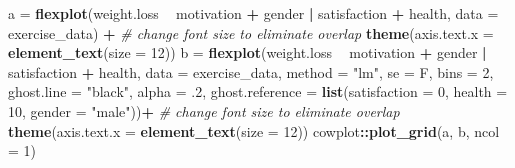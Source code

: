 \documentclass[
  doc]{apa6}
\newenvironment{Shaded}{\begin{snugshade}}{\end{snugshade}}
\newcommand{\CommentTok}[1]{\textcolor[rgb]{0.56,0.35,0.01}{\textit{#1}}}
\newcommand{\DataTypeTok}[1]{\textcolor[rgb]{0.13,0.29,0.53}{#1}}
\newcommand{\DecValTok}[1]{\textcolor[rgb]{0.00,0.00,0.81}{#1}}
\newcommand{\FloatTok}[1]{\textcolor[rgb]{0.00,0.00,0.81}{#1}}
\newcommand{\KeywordTok}[1]{\textcolor[rgb]{0.13,0.29,0.53}{\textbf{#1}}}
\newcommand{\NormalTok}[1]{#1}
\newcommand{\OperatorTok}[1]{\textcolor[rgb]{0.81,0.36,0.00}{\textbf{#1}}}
\newcommand{\StringTok}[1]{\textcolor[rgb]{0.31,0.60,0.02}{#1}}
\begin{document}
\begin{Shaded}
\begin{Highlighting}[]
\NormalTok{a =}\StringTok{ }\KeywordTok{flexplot}\NormalTok{(weight.loss }\OperatorTok{~}\StringTok{ }\NormalTok{motivation }\OperatorTok{+}\StringTok{ }\NormalTok{gender }\OperatorTok{|}\StringTok{ }\NormalTok{satisfaction }\OperatorTok{+}\StringTok{ }\NormalTok{health, }
    \DataTypeTok{data =}\NormalTok{ exercise_data) }\OperatorTok{+}
\StringTok{  }\CommentTok{# change font size to eliminate overlap}
\StringTok{    }\KeywordTok{theme}\NormalTok{(}\DataTypeTok{axis.text.x =} 
            \KeywordTok{element_text}\NormalTok{(}\DataTypeTok{size =} \DecValTok{12}\NormalTok{))}
\NormalTok{b =}\StringTok{ }\KeywordTok{flexplot}\NormalTok{(weight.loss }\OperatorTok{~}\StringTok{ }\NormalTok{motivation }\OperatorTok{+}\StringTok{ }\NormalTok{gender }\OperatorTok{|}\StringTok{ }\NormalTok{satisfaction }\OperatorTok{+}\StringTok{ }\NormalTok{health, }
    \DataTypeTok{data =}\NormalTok{ exercise_data, }
    \DataTypeTok{method =} \StringTok{"lm"}\NormalTok{, }\DataTypeTok{se =}\NormalTok{ F, }\DataTypeTok{bins =} \DecValTok{2}\NormalTok{, }\DataTypeTok{ghost.line =} \StringTok{"black"}\NormalTok{, }\DataTypeTok{alpha =} \FloatTok{.2}\NormalTok{,}
    \DataTypeTok{ghost.reference =} \KeywordTok{list}\NormalTok{(}\DataTypeTok{satisfaction =} \DecValTok{0}\NormalTok{, }\DataTypeTok{health =} \DecValTok{10}\NormalTok{, }\DataTypeTok{gender =} \StringTok{"male"}\NormalTok{))}\OperatorTok{+}
\StringTok{  }\CommentTok{# change font size to eliminate overlap}
\StringTok{    }\KeywordTok{theme}\NormalTok{(}\DataTypeTok{axis.text.x =} 
            \KeywordTok{element_text}\NormalTok{(}\DataTypeTok{size =} \DecValTok{12}\NormalTok{))}
\NormalTok{cowplot}\OperatorTok{::}\KeywordTok{plot_grid}\NormalTok{(a, b, }\DataTypeTok{ncol =} \DecValTok{1}\NormalTok{)}
\end{Highlighting}
\end{Shaded}
\end{document}
